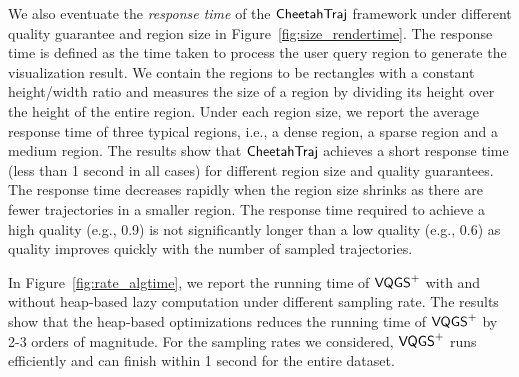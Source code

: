 We also eventuate the \textit{response time} of the $\mathsf{CheetahTraj}$ framework under different quality guarantee and region size in Figure~\ref{fig:size_rendertime}. The response time is defined as the time taken to process the user query region to generate the visualization result. We contain the regions to be rectangles with a constant height/width ratio and measures the size of a region by dividing its height over the height of the entire region. Under each region size, we report the average response time of three typical regions, i.e., a dense region, a sparse region and a medium region. The results show that $\mathsf{CheetahTraj}$ achieves a short response time (less than 1 second in all cases) for different region size and quality guarantees. The response time decreases rapidly when the region size shrinks as there are fewer trajectories in a smaller region. The response time required to achieve a high quality (e.g., 0.9) is not significantly longer than a low quality (e.g., 0.6) as quality improves quickly with the number of sampled trajectories. 

In Figure~\ref{fig:rate_algtime}, we report the running time of $\mathsf{VQGS}^{+}$ with and without heap-based lazy computation under different sampling rate. The results show that the heap-based optimizations reduces the running time of $\mathsf{VQGS}^{+}$ by 2-3 orders of magnitude. For the sampling rates we considered, $\mathsf{VQGS}^{+}$ runs efficiently and can finish within 1 second for the entire dataset.                                  

 





